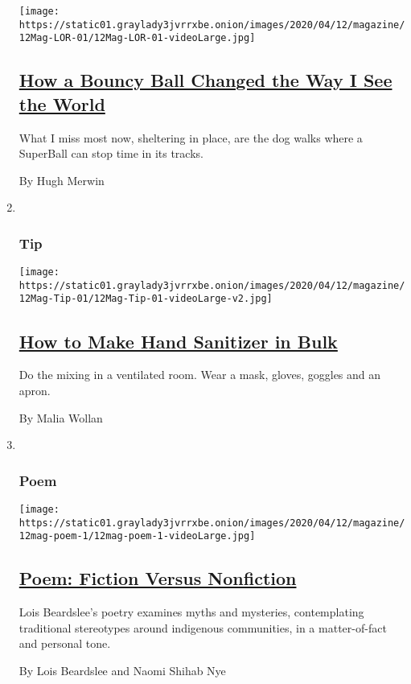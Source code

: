 \begin{enumerate}
  \texttt{[image: https://static01.graylady3jvrrxbe.onion/images/2020/04/12/magazine/12Mag-LOR-01/12Mag-LOR-01-videoLarge.jpg]}

  \hypertarget{how-a-bouncy-ball-changed-the-way-i-see-the-world}{%
  \subsection{\texorpdfstring{\href{/2020/04/03/magazine/how-a-bouncy-ball-changed-the-way-i-see-the-world.html}{How
  a Bouncy Ball Changed the Way I See the
  World}}{How a Bouncy Ball Changed the Way I See the World}}\label{how-a-bouncy-ball-changed-the-way-i-see-the-world}}

  What I miss most now, sheltering in place, are the dog walks where a
  SuperBall can stop time in its tracks.

  By Hugh Merwin
\item ~
  \hypertarget{tip}{%
  \subsubsection{Tip}\label{tip}}

  \texttt{[image: https://static01.graylady3jvrrxbe.onion/images/2020/04/12/magazine/12Mag-Tip-01/12Mag-Tip-01-videoLarge-v2.jpg]}

  \hypertarget{how-to-make-hand-sanitizer-in-bulk}{%
  \subsection{\texorpdfstring{\href{/2020/04/07/magazine/how-to-make-hand-sanitizer-in-bulk-coronavirus-hospitals.html}{How
  to Make Hand Sanitizer in
  Bulk}}{How to Make Hand Sanitizer in Bulk}}\label{how-to-make-hand-sanitizer-in-bulk}}

  Do the mixing in a ventilated room. Wear a mask, gloves, goggles and
  an apron.

  By Malia Wollan
\item ~
  \hypertarget{poem}{%
  \subsubsection{Poem}\label{poem}}

  \texttt{[image: https://static01.graylady3jvrrxbe.onion/images/2020/04/12/magazine/12mag-poem-1/12mag-poem-1-videoLarge.jpg]}

  \hypertarget{poem-fiction-versus-nonfiction}{%
  \subsection{\texorpdfstring{\href{/2020/04/09/magazine/poem-fiction-versus-nonfiction.html}{Poem:
  Fiction Versus
  Nonfiction}}{Poem: Fiction Versus Nonfiction}}\label{poem-fiction-versus-nonfiction}}

  Lois Beardslee's poetry examines myths and mysteries, contemplating
  traditional stereotypes around indigenous communities, in a
  matter-of-fact and personal tone.

  By Lois Beardslee and Naomi Shihab Nye
\end{enumerate}

